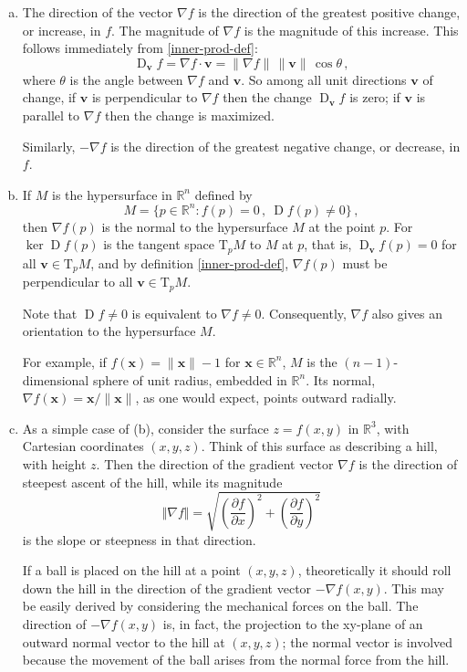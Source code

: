 \documentclass[12pt]{article}
\newcommand{\real}{\mathbb{R}}
\providecommand{\norm}[1]{\lVert#1\rVert}
\DeclareMathOperator{\D}{D}
\newcommand{\lp}{\left(}
\newcommand{\rp}{\right)}
\newcommand{\vv}{\mathbf{v}}
\newcommand{\vx}{\mathbf{x}}
\begin{document}
\begin{enumerate}[(a)]
\item
The direction of the vector $\nabla f$ is the direction of the greatest positive change, or increase, in $f$.
The magnitude of $\nabla f$ is the magnitude of this increase.
This follows immediately from \eqref{inner-prod-def}:
\[
\D_\vv f = \nabla f \cdot \vv = \norm{\nabla f} \, \norm{\vv} \, \cos \theta\,,
\]
where $\theta$ is the angle between $\nabla f$ and $\vv$.
So among all unit directions $\vv$ of change, if $\vv$ is perpendicular to $\nabla f$
then the change $\D_\vv f$ is zero; if $\vv$ is parallel to $\nabla f$ then the change is maximized.

Similarly,
$-\nabla f$ is the direction of the greatest negative change, or decrease, in $f$.

\item
If $M$ is the hypersurface in $\real^n$ defined by
\[
M = \{ p \in \real^n : f(p) = 0 \,, \: \D f(p) \neq 0 \}\,,
\]
then $\nabla f(p)$ is the normal to the hypersurface $M$ at the point $p$.  For $\ker \D f(p)$ is the tangent space $\mathrm{T}_p M$
to $M$ at $p$, that is, $\D_\vv f(p) = 0$ for all $\vv \in \mathrm{T}_p M$,
and by definition \eqref{inner-prod-def}, $\nabla f(p)$ must be perpendicular to all $\vv \in \mathrm{T}_p M$.

Note that $\D f \neq 0$ is equivalent to $\nabla f \neq 0$.  Consequently, $\nabla f$ also gives
an orientation to the hypersurface $M$.

For example, if $f(\vx) = \norm{\vx} - 1$ for $\vx \in \real^n$,
$M$ is the $(n-1)$-dimensional sphere of unit radius, embedded in $\real^n$.
Its normal, $\nabla f(\vx) = \vx/\norm{\vx}$, as one would expect, points outward radially.

\item
As a simple case of (b), consider the 
surface $z = f(x, y)$ in $\real^3$, with Cartesian coordinates $(x, y, z)$.
Think of this surface as describing a hill, with height $z$.
Then the direction of the gradient vector $\nabla f$
is the direction of steepest ascent of the hill, while its
magnitude 
\[
\Vert \nabla f \Vert = \sqrt{ \lp \frac{\partial f}{\partial x}
\rp^2 + \lp \frac{\partial f}{\partial y} \rp^2 }
\]
is the slope or steepness in that direction. 

If a ball is placed on the hill at a point $(x, y, z)$,
theoretically it should roll down the hill in the direction of the gradient
vector $-\nabla f(x, y)$.  This may be easily derived by considering the mechanical forces
on the ball.  The direction of $-\nabla f(x, y)$ is, in fact, the projection
to the xy-plane of an outward normal vector to the hill at $(x, y, z)$;
the normal vector is involved because the movement of the ball
arises from the normal force from the hill.


\end{enumerate}
\end{document}
